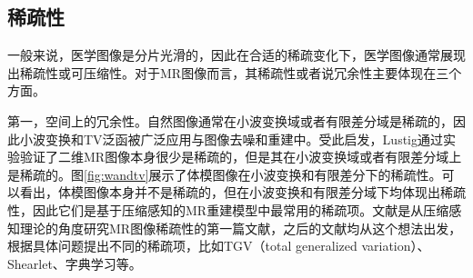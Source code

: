 \subsection{稀疏性}
\label{sec:sparsity}
一般来说，医学图像是分片光滑的，因此在合适的稀疏变化下，医学图像通常展现出稀疏性或可压缩性。对于MR图像而言，其稀疏性或者说冗余性主要体现在三个方面。

第一，空间上的冗余性。自然图像通常在小波变换域或者有限差分域是稀疏的，因此小波变换和TV泛函被广泛应用与图像去噪和重建中。受此启发，Lustig\cite{lustig2006}通过实验验证了二维MR图像本身很少是稀疏的，但是其在小波变换域或者有限差分域上是稀疏的。图\ref{fig:wandtv}展示了体模图像在小波变换和有限差分下的稀疏性。可以看出，体模图像本身并不是稀疏的，但在小波变换和有限差分域下均体现出稀疏性，因此它们是基于压缩感知的MR重建模型中最常用的稀疏项。文献\cite{lustig2006}是从压缩感知理论的角度研究MR图像稀疏性的第一篇文献，之后的文献均从这个想法出发，根据具体问题提出不同的稀疏项，比如TGV（total generalized variation）\cite{tgv}、Shearlet\cite{easley2008sparse}、字典学习\cite{ksvd}等。


